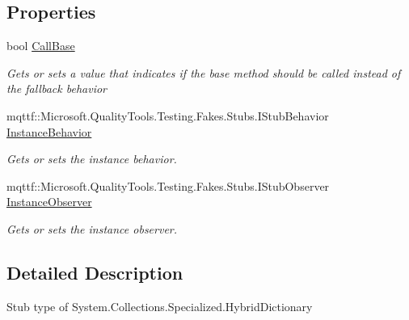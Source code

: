 \subsection*{Properties}
\begin{DoxyCompactItemize}
\item 
bool \hyperlink{class_system_1_1_collections_1_1_specialized_1_1_fakes_1_1_stub_hybrid_dictionary_ae8c4dfd20bc839bd0db2feaf6df50273}{Call\-Base}
\begin{DoxyCompactList}\small\item\em Gets or sets a value that indicates if the base method should be called instead of the fallback behavior\end{DoxyCompactList}\item 
mqttf\-::\-Microsoft.\-Quality\-Tools.\-Testing.\-Fakes.\-Stubs.\-I\-Stub\-Behavior \hyperlink{class_system_1_1_collections_1_1_specialized_1_1_fakes_1_1_stub_hybrid_dictionary_a2c1d874d246664b8f20e7364683d37e9}{Instance\-Behavior}
\begin{DoxyCompactList}\small\item\em Gets or sets the instance behavior.\end{DoxyCompactList}\item 
mqttf\-::\-Microsoft.\-Quality\-Tools.\-Testing.\-Fakes.\-Stubs.\-I\-Stub\-Observer \hyperlink{class_system_1_1_collections_1_1_specialized_1_1_fakes_1_1_stub_hybrid_dictionary_a9c91ef398c2c18a82737b3dc263a83c9}{Instance\-Observer}
\begin{DoxyCompactList}\small\item\em Gets or sets the instance observer.\end{DoxyCompactList}\end{DoxyCompactItemize}


\subsection{Detailed Description}
Stub type of System.\-Collections.\-Specialized.\-Hybrid\-Dictionary



